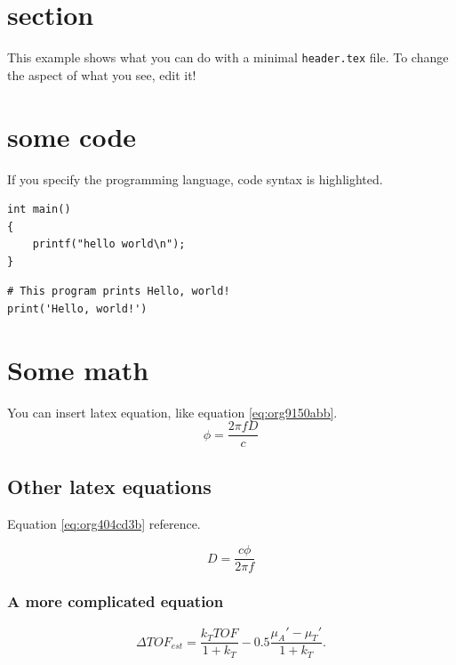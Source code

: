 


\maketitle

\newpage

\section{section}
\label{sec:org4522019}
This example shows what you can do with a minimal \texttt{header.tex} file.
To change the aspect of what you see, edit it!

\section{some code}
\label{sec:orgceda2b9}
If you specify the programming language, code syntax is highlighted.
\begin{verbatim}
int main()
{
    printf("hello world\n");
}
\end{verbatim}

\begin{verbatim}
# This program prints Hello, world!
print('Hello, world!')
\end{verbatim}

\section{Some math}
\label{sec:org0b92a95}
You can insert latex equation, like equation \ref{eq:org9150abb}.
\begin{equation}
\label{eq:org9150abb}
\phi = \frac{2\pi fD}{c}
\end{equation}
\subsection{Other latex equations}
\label{sec:org0db8ec5}
Equation \ref{eq:org404cd3b} reference.

\begin{equation}
\label{eq:org404cd3b}
D = \frac{c\phi}{2\pi f}
\end{equation}

\subsubsection{A more complicated equation}
\label{sec:orge7da182}

\begin{equation}
\Delta TOF_{est} = \frac{k_T TOF}{1+k_T } - 0.5 \frac{\mu_A' - \mu_T'}{1+k_T}.
\end{equation}

